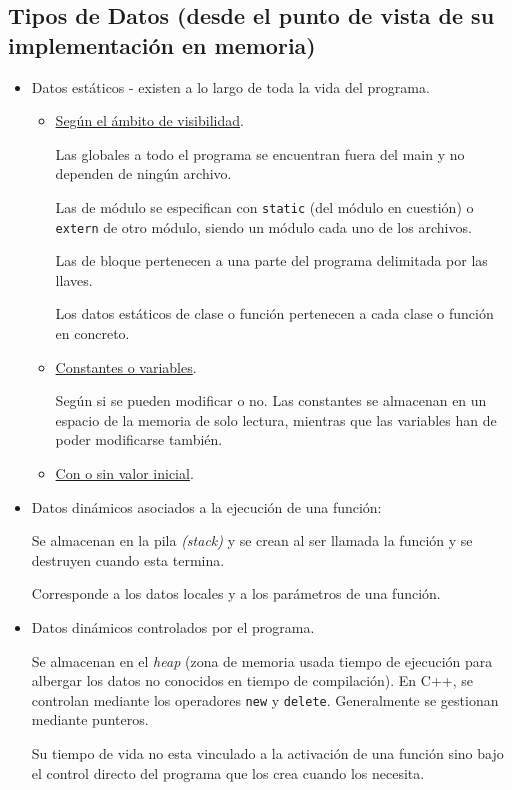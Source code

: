 \subsection{Tipos de Datos (desde el punto de vista de su implementación en memoria)}

\begin{itemize}
    \item Datos estáticos - existen a lo largo de toda la vida del programa.
    \begin{itemize}
        \item \underline{Según el ámbito de visibilidad}.

        Las globales a todo el programa se encuentran fuera del main y no dependen de ningún archivo.
        
        Las de módulo se especifican con \verb|static| (del módulo en cuestión) o \verb|extern| de otro módulo, siendo un módulo cada uno de los archivos.
        
        Las de bloque pertenecen a una parte del programa delimitada por las llaves.

        Los datos estáticos de clase o función pertenecen a cada clase o función en concreto.

        \item \underline{Constantes o variables}.

        Según si se pueden modificar o no. Las constantes se almacenan en un espacio de la memoria de solo lectura, mientras que las variables han de poder modificarse también.

        \item \underline{Con o sin valor inicial}.
    \end{itemize}

    \item Datos dinámicos asociados a la ejecución de una función:

    Se almacenan en la pila \textit{(stack)} y se crean al ser llamada la función y se destruyen cuando esta termina.

    Corresponde a los datos locales y a los parámetros de una función.


    \item Datos dinámicos controlados por el programa.

    Se almacenan en el \textit{heap} (zona de memoria usada tiempo de ejecución para albergar los datos no conocidos en tiempo de compilación). En C++, se controlan mediante los operadores \verb|new| y \verb|delete|. Generalmente se gestionan mediante punteros.

    Su tiempo de vida no esta vinculado a la activación de una función sino bajo el control directo del programa que los crea cuando los necesita.
\end{itemize}

